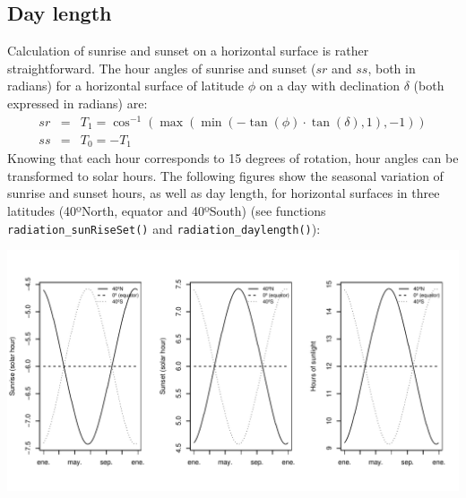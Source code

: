 \documentclass[11pt,a4paper]{article}
\begin{document}
\subsection{Day length}
Calculation of sunrise and sunset on a horizontal surface is rather straightforward. The hour angles of sunrise and sunset ($sr$ and $ss$, both in radians) for a horizontal surface of latitude $\phi$ on a day with declination $\delta$ (both expressed in radians) are:
\begin{eqnarray}
sr &=& T_1 = \cos^{-1}\left(\max(\min(-\tan(\phi) \cdot \tan(\delta),1),-1)\right) \\
ss &=& T_0 = - T_1
\end{eqnarray}
Knowing that each hour corresponds to 15 degrees of rotation, hour angles can be transformed to solar hours. The following figures show the seasonal variation of sunrise and sunset hours, as well as day length, for horizontal surfaces in three latitudes (40ºNorth, equator and 40ºSouth) (see functions \texttt{radiation\_sunRiseSet()} and  \texttt{radiation\_daylength()}):
\begin{center}
\includegraphics{Meteorology-020}
\end{center}
\end{document}
